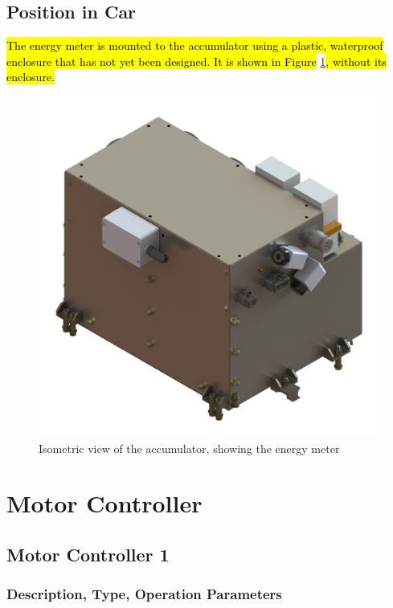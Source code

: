 \documentclass{article}
\DeclareRobustCommand{\hlr}[1]{{\sethlcolor{red}\hl{#1}}}
\begin{document}
    \subsection{Position in Car}

        \hlr{The energy meter is mounted to the accumulator using a plastic, waterproof enclosure that has not yet been designed. It is shown in Figure} \ref{accumiso}\hlr{, without its enclosure.}

        \begin{figure}[H]
            \centering
            \includegraphics[width = 0.7 \textwidth]{accumulator_isoview}
            \caption{Isometric view of the accumulator, showing the energy meter}
            \label{accumiso}
        \end{figure}

\newpage

\section{Motor Controller} \label{MCs}

    \subsection{Motor Controller 1} \label{MC1}

        \subsubsection{Description, Type, Operation Parameters}

\end{document}
